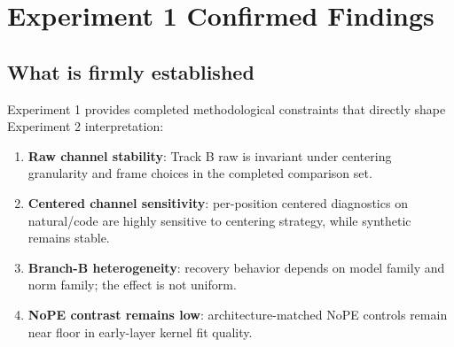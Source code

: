 \documentclass[11pt]{article}
\begin{document}
\section{Experiment 1 Confirmed Findings}
\subsection*{What is firmly established}
Experiment 1 provides completed methodological constraints that directly shape Experiment 2 interpretation:
\begin{enumerate}[leftmargin=*]
  \item \textbf{Raw channel stability}: Track B raw is invariant under centering granularity and frame choices in the completed comparison set.
  \item \textbf{Centered channel sensitivity}: per-position centered diagnostics on natural/code are highly sensitive to centering strategy, while synthetic remains stable.
  \item \textbf{Branch-B heterogeneity}: recovery behavior depends on model family and norm family; the effect is not uniform.
  \item \textbf{NoPE contrast remains low}: architecture-matched NoPE controls remain near floor in early-layer kernel fit quality.
\end{enumerate}
\end{document}

